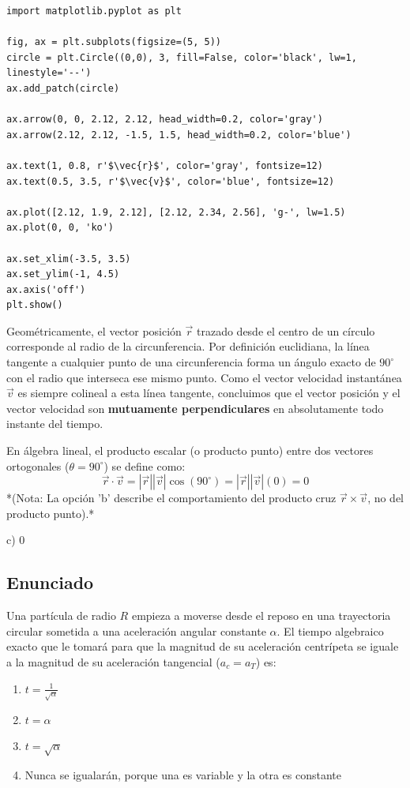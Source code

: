 \documentclass[12pt, a4paper]{article}
\begin{document}
\begin{verbatim}
import matplotlib.pyplot as plt

fig, ax = plt.subplots(figsize=(5, 5))
circle = plt.Circle((0,0), 3, fill=False, color='black', lw=1, linestyle='--')
ax.add_patch(circle)

ax.arrow(0, 0, 2.12, 2.12, head_width=0.2, color='gray')
ax.arrow(2.12, 2.12, -1.5, 1.5, head_width=0.2, color='blue')

ax.text(1, 0.8, r'$\vec{r}$', color='gray', fontsize=12)
ax.text(0.5, 3.5, r'$\vec{v}$', color='blue', fontsize=12)

ax.plot([2.12, 1.9, 2.12], [2.12, 2.34, 2.56], 'g-', lw=1.5)
ax.plot(0, 0, 'ko')

ax.set_xlim(-3.5, 3.5)
ax.set_ylim(-1, 4.5)
ax.axis('off')
plt.show()
\end{verbatim}

Geométricamente, el vector posición $\vec{r}$ trazado desde el centro de un círculo corresponde al radio de la circunferencia.
Por definición euclidiana, la línea tangente a cualquier punto de una circunferencia forma un ángulo exacto de $90^\circ$ con el radio que interseca ese mismo punto.
Como el vector velocidad instantánea $\vec{v}$ es siempre colineal a esta línea tangente, concluimos que el vector posición y el vector velocidad son \textbf{mutuamente perpendiculares} en absolutamente todo instante del tiempo.

En álgebra lineal, el producto escalar (o producto punto) entre dos vectores ortogonales ($\theta = 90^\circ$) se define como:
$$ \vec{r} \cdot \vec{v} = |\vec{r}| |\vec{v}| \cos(90^\circ) = |\vec{r}| |\vec{v}| (0) = 0 $$
*(Nota: La opción 'b' describe el comportamiento del producto cruz $\vec{r} \times \vec{v}$, no del producto punto).*

\begin{tcolorbox}[colback=green!5!white, colframe=green!50!black, title=Respuesta Final]
\centering \Large c) $0$
\end{tcolorbox}

\newpage

\subsection*{Enunciado}
Una partícula de radio $R$ empieza a moverse desde el reposo en una trayectoria circular sometida a una aceleración angular constante $\alpha$. El tiempo algebraico exacto que le tomará para que la magnitud de su aceleración centrípeta se iguale a la magnitud de su aceleración tangencial ($a_c = a_T$) es:
\begin{enumerate}[label=\alph*)]
    \item $t = \frac{1}{\sqrt{\alpha}}$
    \item $t = \alpha$
    \item $t = \sqrt{\alpha}$
    \item Nunca se igualarán, porque una es variable y la otra es constante
\end{enumerate}
\end{document}
